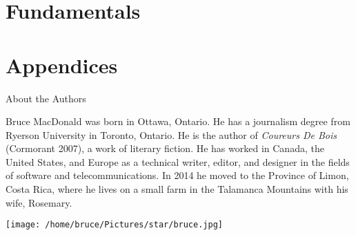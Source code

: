 \documentclass[letterpaper,9pt,twoside,titlepage,onecolumn,openany]{book}
\begin{document}
\tableofcontents

\part{Fundamentals}






\part{Appendices}






\newpage
\thispagestyle{empty}

\begin{center}

\Large{About the Authors}

\end{center}

\vspace{20mm}
\noindent
Bruce MacDonald was born in Ottawa, Ontario. He has a journalism degree from Ryerson University in Toronto, Ontario. He is the author of \textit{Coureurs De Bois} (Cormorant 2007), a work of literary fiction. He has worked in Canada, the United States, and Europe as a technical writer, editor, and designer in the fields of software and telecommunications. In 2014 he moved to the Province of Limon, Costa Rica, where he lives on a small farm in the Talamanca Mountains with his wife, Rosemary.

\begin{center}


\texttt{[image: /home/bruce/Pictures/star/bruce.jpg]}

\end{center}
\end{document}

